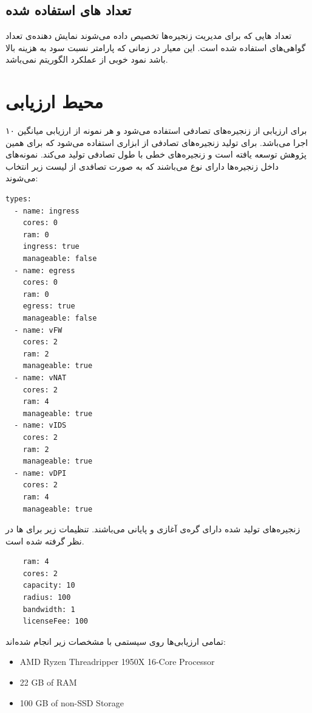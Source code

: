 \subsection{تعداد های استفاده شده}

تعداد هایی که برای مدیریت زنجیره‌ها تخصیص داده می‌شوند نمایش دهنده‌ی تعداد گواهی‌های استفاده شده است.
این معیار در زمانی که پارامتر نسبت سود به هزینه بالا باشد نمود خوبی از عملکرد الگوریتم نمی‌باشد.

\section{محیط ارزیابی}

برای ارزیابی از زنجیره‌های تصادفی استفاده می‌شود و هر نمونه از ارزیابی میانگین ۱۰ اجرا می‌باشد.
برای تولید زنجیره‌های تصادفی از ابزاری استفاده می‌شود که برای همین پژوهش توسعه یافته است و زنجیره‌های خطی با طول تصادفی تولید می‌کند.
نمونه‌های داخل زنجیره‌ها دارای نوع می‌باشند که به صورت تصافدی از لیست زیر انتخاب می‌شوند:

\begin{latin}
    \begin{verbatim}
types:
  - name: ingress
    cores: 0
    ram: 0
    ingress: true
    manageable: false
  - name: egress
    cores: 0
    ram: 0
    egress: true
    manageable: false
  - name: vFW
    cores: 2
    ram: 2
    manageable: true
  - name: vNAT
    cores: 2
    ram: 4
    manageable: true
  - name: vIDS
    cores: 2
    ram: 2
    manageable: true
  - name: vDPI
    cores: 2
    ram: 4
    manageable: true
    \end{verbatim}
\end{latin}

زنجیره‌های تولید شده دارای گره‌ی آغازی و پایانی می‌باشند.
تنظیمات زیر برای ها در نظر گرفته شده است.

\begin{latin}
    \begin{verbatim}
    ram: 4
    cores: 2
    capacity: 10
    radius: 100
    bandwidth: 1
    licenseFee: 100
    \end{verbatim}
\end{latin}

تمامی ارزیابی‌ها روی سیستمی با مشخصات زیر انجام شده‌اند:

\begin{latin}
    \begin{itemize}
        \item AMD Ryzen Threadripper 1950X 16-Core Processor
        \item 22 GB of RAM
        \item 100 GB of non-SSD Storage
    \end{itemize}
\end{latin}

